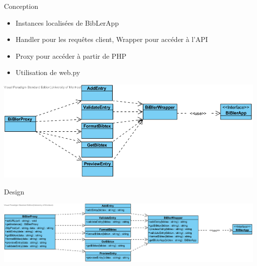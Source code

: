 \documentclass{beamer}
\begin{document}
\begin{frame}{Conception}

\begin{itemize}
  \item Instances localisées de BibLerApp
  \item Handler pour les requêtes client, Wrapper pour accéder à l'API
  \item Proxy pour accéder à partir de PHP
  \item Utilisation de web.py
\end{itemize}


\includegraphics[width=\linewidth,height=\textheight,keepaspectratio]{DomainClassDiagram.png}


\end{frame}
\begin{frame}{Design}

\includegraphics[width=\linewidth,height=\textheight,keepaspectratio]{ClassDiagram.png}
\end{frame}
\end{document}
